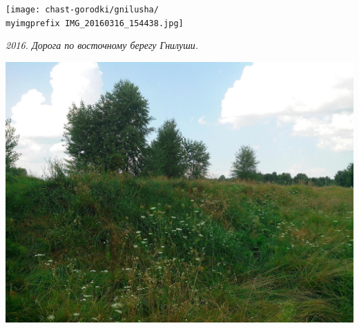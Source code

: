 \begin{center}
\texttt{[image: chast-gorodki/gnilusha/\\myimgprefix IMG\_20160316\_154438.jpg]}

\textit{2016. Дорога по восточному берегу Гнилуши.}
\end{center}

\newpage
\vspace*{\fill}
\begin{center}
\includegraphics[width=\linewidth]{chast-gorodki/gnilusha/s_IMG_20140806_134029.jpg}
\end{center}

